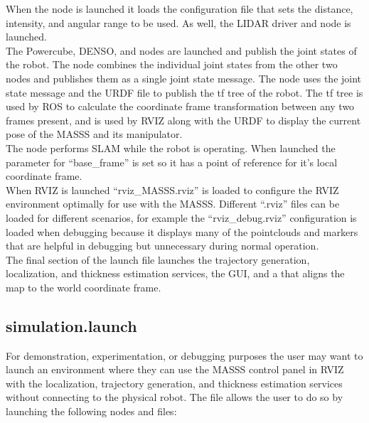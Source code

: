 When the  node is launched it loads the configuration file that sets the distance, intensity, and angular range to be used. As well, the LIDAR driver and  node is launched.\\

The Powercube, DENSO, and  nodes are launched and publish the joint states of the robot. The  node combines the individual joint states from the other two nodes and publishes them as a single joint state message. The node  uses the joint state message and the URDF file to publish the tf tree of the robot. The tf tree is used by ROS to calculate the coordinate frame transformation between any two frames present, and is used by RVIZ along with the URDF to display the current pose of the MASSS and its manipulator.\\

The node  performs SLAM while the robot is operating. When launched the parameter for ``base\_frame'' is set so it has a point of reference for it's local coordinate frame.\\

When RVIZ is launched ``rviz\_MASSS.rviz'' is loaded to configure the RVIZ environment optimally for use with the MASSS. Different ``.rviz'' files can be loaded for different scenarios, for example the ``rviz\_debug.rviz'' configuration is loaded when debugging because it displays many of the pointclouds and markers that are helpful in debugging but unnecessary during normal operation.\\

The final section of the launch file launches the trajectory generation, localization, and thickness estimation services, the  GUI, and a  that aligns the map to the world coordinate frame.\\

\subsection{simulation.launch}

For demonstration, experimentation, or debugging purposes the user may want to launch an environment where they can use the MASSS control panel in RVIZ with the localization, trajectory generation, and thickness estimation services without connecting to the physical robot. The  file allows the user to do so by launching the following nodes and files:

